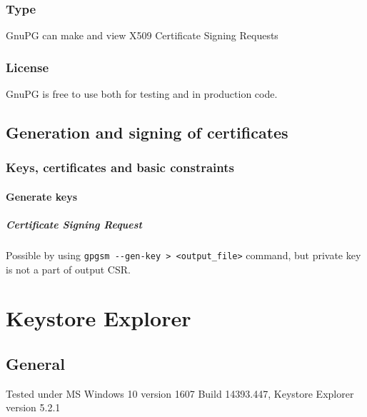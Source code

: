 \documentclass[10pt, a4paper]{report}
\begin{document}
{  \subsection{Type}
GnuPG can make and view X509 Certificate Signing Requests

  \subsection{License}
GnuPG is free to use both for testing and in production code.
  
\section{Generation and signing of certificates}

  \subsection{Keys, certificates and basic constraints}
  
    \subsubsection{Generate keys}
    
      \paragraph{Certificate Signing Request}
Possible by using \verb+gpgsm --gen-key > <output_file>+ command, but private key is not a part of output CSR.     


\chapter{Keystore Explorer}

\section{General}

Tested under MS Windows 10 version 1607 Build 14393.447, Keystore Explorer version 5.2.1

}
\end{document}
